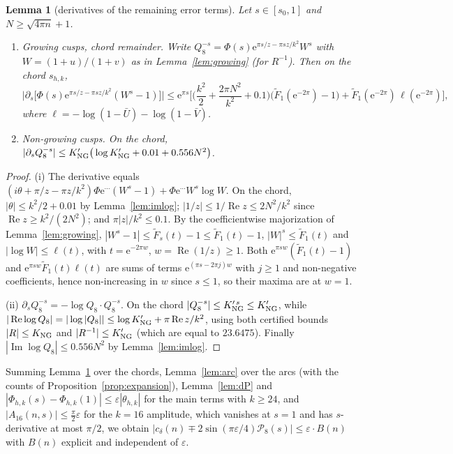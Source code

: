 \documentclass[11pt]{amsart}
\newtheorem{lemma}[theorem]{Lemma}
\theoremstyle{remark}
\theoremstyle{definition}
\newcommand{\cP}{\mathcal P}
\newcommand{\Rea}{\operatorname{Re}}
\newcommand{\Ima}{\operatorname{Im}}
\newcommand{\e}{\mathrm e}
\begin{document}
\begin{lemma}[derivatives of the remaining error terms]\label{lem:derr}
Let $s\in[s_0,1]$ and $N\ge\sqrt{4\pi n}+1$.
\begin{enumerate}[label=(\roman*),leftmargin=2em]
\item \emph{Growing cusps, chord remainder.} Write $Q_8^{-s}=\Phi(s)\e^{\pi s/z-\pi sz/k^2}W^s$ with $W=(1+u)/(1+v)$ as in Lemma~\ref{lem:growing} (for $R^{-1}$). Then on the chord $s_{h,k}$,
\[
\big|\partial_s\big[\Phi(s)\e^{\pi s/z-\pi sz/k^2}(W^s-1)\big]\big|\le\e^{\pi s}\Big[\Big(\frac{k^2}2+\frac{2\pi N^2}{k^2}+0.1\Big)\big(\widetilde F_1(\e^{-2\pi})-1\big)+\widetilde F_1(\e^{-2\pi})\,\ell(\e^{-2\pi})\Big],
\]
where $\ell=-\log(1-\bar U)-\log(1-\bar V)$.
\item \emph{Non-growing cusps.} On the chord, $|\partial_sQ_8^{-s}|\le K'_{\rm NG}\big(\log K'_{\rm NG}+0.01+0.556N^2\big)$.
\end{enumerate}
\end{lemma}
\begin{proof}
(i) The derivative equals $(i\theta+\pi/z-\pi z/k^2)\Phi\e^{\cdots}(W^s-1)+\Phi\e^{\cdots}W^s\log W$. On the chord, $|\theta|\le k^2/2+0.01$ by Lemma~\ref{lem:imlog}; $|1/z|\le1/\Rea z\le2N^2/k^2$ since $\Rea z\ge k^2/(2N^2)$; and $\pi|z|/k^2\le0.1$. By the coefficientwise majorization of Lemma~\ref{lem:growing}, $|W^s-1|\le\widetilde F_s(t)-1\le\widetilde F_1(t)-1$, $|W|^s\le\widetilde F_1(t)$ and $|\log W|\le\ell(t)$, with $t=\e^{-2\pi w}$, $w=\Rea(1/z)\ge1$. Both $\e^{\pi sw}(\widetilde F_1(t)-1)$ and $\e^{\pi sw}\widetilde F_1(t)\ell(t)$ are sums of terms $\e^{(\pi s-2\pi j)w}$ with $j\ge1$ and non-negative coefficients, hence non-increasing in $w$ since $s\le1$, so their maxima are at $w=1$.

(ii) $\partial_sQ_8^{-s}=-\log Q_8\cdot Q_8^{-s}$. On the chord $|Q_8^{-s}|\le K'^{\,s}_{\rm NG}\le K'_{\rm NG}$, while $|\Rea\log Q_8|=|\log|Q_8||\le\log K'_{\rm NG}+\pi\Rea z/k^2$, using both certified bounds $|R|\le K_{\rm NG}$ and $|R^{-1}|\le K'_{\rm NG}$ (which are equal to $23.6475$). Finally $|\Ima\log Q_8|\le0.556N^2$ by Lemma~\ref{lem:imlog}.
\end{proof}

Summing Lemma~\ref{lem:derr} over the chords, Lemma~\ref{lem:arc} over the arcs (with the counts of Proposition~\ref{prop:expansion}), Lemma~\ref{lem:dP} and $|\Phi_{h,k}(s)-\Phi_{h,k}(1)|\le\varepsilon|\theta_{h,k}|$ for the main terms with $k\ge24$, and $|A_{16}(n,s)|\le\frac\pi2\varepsilon$ for the $k=16$ amplitude, which vanishes at $s=1$ and has $s$-derivative at most $\pi/2$, we obtain $|c_\delta(n)\mp2\sin(\pi\varepsilon/4)\cP_8(s)|\le\varepsilon\cdot B(n)$ with $B(n)$ explicit and independent of $\varepsilon$.
\end{document}
